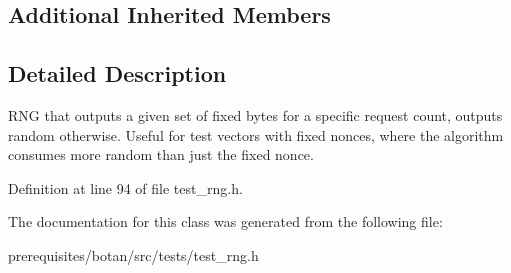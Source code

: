\subsection*{Additional Inherited Members}


\subsection{Detailed Description}
R\+NG that outputs a given set of fixed bytes for a specific request count, outputs random otherwise. Useful for test vectors with fixed nonces, where the algorithm consumes more random than just the fixed nonce. 

Definition at line 94 of file test\+\_\+rng.\+h.



The documentation for this class was generated from the following file\+:\begin{DoxyCompactItemize}
\item 
prerequisites/botan/src/tests/test\+\_\+rng.\+h\end{DoxyCompactItemize}
